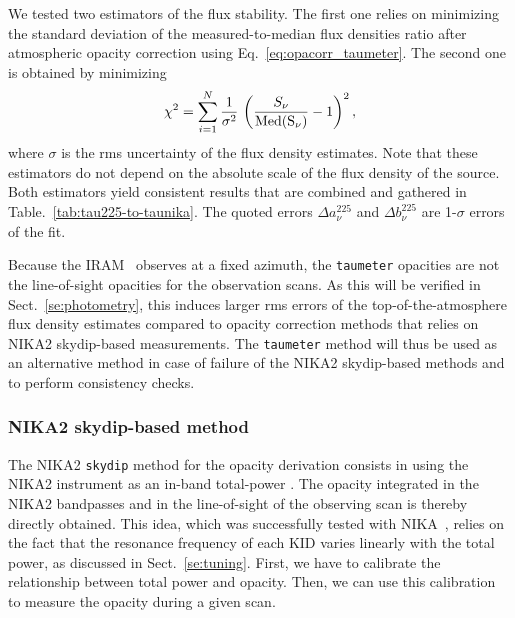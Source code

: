 We tested two estimators of the flux stability. The first one relies
on minimizing the standard deviation of the measured-to-median flux
densities ratio after atmospheric opacity correction using
Eq.~\ref{eq:opacorr_taumeter}. The second one is obtained by minimizing
\begin{equation}
\chi^2 = \sum_{i=1}^{N} \frac{1}{\sigma^2} \, \left( \frac{S_\nu}{\rm{Med}(S_\nu)} -1 \right)^2,  
\end{equation}
where $\sigma$ is the rms uncertainty of the flux density estimates. Note
that these estimators do not depend on
the absolute scale of the flux density of the source. Both estimators
yield consistent results that are combined and gathered in
Table.~\ref{tab:tau225-to-taunika}. The quoted errors
$\Delta a_\nu^{225}$ and $\Delta b_\nu^{225}$ are 1-$\sigma$ errors of
the fit.

Because the IRAM \taumeter\ observes at a fixed azimuth, the
{\tt taumeter} opacities are not the line-of-sight opacities
for the observation scans. As this will be verified in
Sect.~\ref{se:photometry}, this induces larger rms errors of
the top-of-the-atmosphere flux density estimates compared to
opacity correction methods that relies on NIKA2 skydip-based
measurements. The {\tt taumeter} method will thus be used
as an alternative method in case of failure of the NIKA2 skydip-based
methods and to perform consistency checks.


\subsubsection{NIKA2 skydip-based method}
\label{se:skydip-method}

The NIKA2 {\tt skydip} method for the opacity derivation consists in
using the NIKA2 instrument as an in-band total-power \taumeter. {\lp The opacity
integrated in the NIKA2 bandpasses and in the line-of-sight of the
observing scan is thereby directly obtained.} 
This idea,
which was successfully tested with NIKA~\citep{Catalano2014}, relies
on the fact that the resonance frequency of each KID varies linearly
with the total power, as discussed in Sect.~\ref{se:tuning}.
First, we have to calibrate the relationship between total
power and opacity. Then, we can use this calibration to measure the
opacity during a given scan. %

